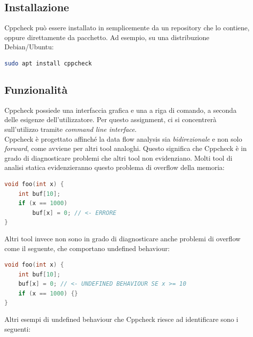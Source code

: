\documentclass{article}
\begin{document}
\subsection{Installazione}
\label{sec:cppcheck:installazione}

Cppcheck può essere installato in semplicemente da un repository
che lo contiene, oppure direttamente da pacchetto. Ad esempio, su
una distribuzione Debian/Ubuntu: \\

\begin{lstlisting}[language=bash]
sudo apt install cppcheck
\end{lstlisting}

\subsection{Funzionalità}
\label{sec:cppcheck:funzionalita}

Cppcheck possiede una interfaccia grafica e una a riga di comando, a seconda
delle esigenze dell'utilizzatore. Per questo assignment, ci si concentrerà
sull'utilizzo tramite \emph{command line interface}. \\

Cppcheck è progettato affinché la data flow analysis sia \emph{bidirezionale} e non
solo \emph{forward}, come avviene per altri tool analoghi. Questo significa che
Cppcheck è in grado di diagnosticare problemi che altri tool non evidenziano.
Molti tool di analisi statica evidenzieranno questo problema di overflow della memoria:

\begin{lstlisting}[language=c]
void foo(int x) {
    int buf[10];
    if (x == 1000)
        buf[x] = 0; // <- ERRORE
}
\end{lstlisting}

Altri tool invece non sono in grado di diagnosticare anche problemi di overflow come il
seguente, che comportano undefined behaviour:

\begin{lstlisting}[language=c]
void foo(int x) {
    int buf[10];
    buf[x] = 0; // <- UNDEFINED BEHAVIOUR SE x >= 10
    if (x == 1000) {}
}
\end{lstlisting}

Altri esempi di undefined behaviour che Cppcheck riesce ad identificare sono i
seguenti:
\end{document}
